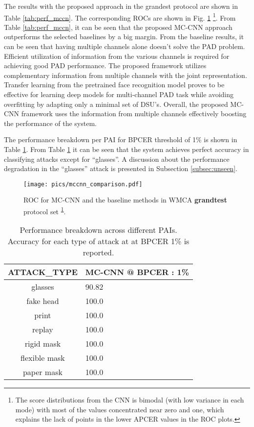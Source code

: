 \documentclass[journal]{IEEEtran}
\begin{document}
The results with the proposed approach in the grandest protocol are shown in Table \ref{tab:perf_mccn}. The corresponding ROCs are shown in Fig. \ref{fig:roc_idiap_mccnn} \footnote{\label{note1} The score distributions from the CNN is bimodal (with low variance in each mode) with most of the values concentrated near zero and one, which explains the lack of points in the lower APCER values in the ROC plots.}.
From Table \ref{tab:perf_mccn}, it can be seen that the proposed MC-CNN approach outperforms the selected baselines by a big margin. From the baseline results, it can be seen that having multiple channels alone doesn't solve the PAD problem. Efficient utilization of information from the various channels is required for achieving good PAD performance. The proposed framework utilizes complementary information from multiple channels with the joint representation. Transfer learning from the pretrained face recognition model proves to be effective for learning deep models for multi-channel PAD task while avoiding overfitting by adapting only a minimal set of DSU's. Overall, the proposed MC-CNN framework uses the information from multiple channels effectively boosting the performance of the system.

The performance breakdown per PAI for BPCER threshold of 1\% is shown in Table \ref{tab:perfbreakdown}. From Table \ref{tab:perfbreakdown} it can be seen that the system achieves perfect accuracy in classifying attacks except for ``glasses''. A discussion about the performance degradation in the ``glasses'' attack is presented in Subsection \ref{subsec:unseen}.





\begin{figure}[t]
\centering
\texttt{[image: pics/mccnn\_comparison.pdf]}
\caption{ROC for MC-CNN and the baseline methods in WMCA \textbf{grandtest} protocol  set \textsuperscript{\ref{note1}}.} 
\label{fig:roc_idiap_mccnn}
\end{figure}


\begin{table}[t]
\centering
\caption{Performance breakdown across different PAIs. Accuracy for each type of attack at at BPCER 1\% is reported.}
\label{tab:perfbreakdown}
\begin{tabular}{@{}cl@{}}
\toprule
ATTACK\_TYPE & MC-CNN @ BPCER : 1\% \\ \midrule
glasses      & 90.82                       \\
fake head     & 100.0                      \\
print        & 100.0                      \\
replay       & 100.0                      \\
rigid mask    & 100.0                    \\
flexible mask & 100.0                      \\
paper mask    & 100.0                       \\
 \bottomrule
\end{tabular}
\end{table}
\end{document}
